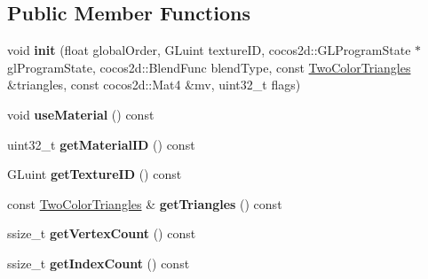 \subsection*{Public Member Functions}
\begin{DoxyCompactItemize}
\item 
\mbox{\label{classspine_1_1TwoColorTrianglesCommand_a385e4c629471fbf28207ce3c9ecf8922}} 
void {\bfseries init} (float global\+Order, G\+Luint texture\+ID, cocos2d\+::\+G\+L\+Program\+State $\ast$gl\+Program\+State, cocos2d\+::\+Blend\+Func blend\+Type, const \hyperlink{structspine_1_1TwoColorTriangles}{Two\+Color\+Triangles} \&triangles, const cocos2d\+::\+Mat4 \&mv, uint32\+\_\+t flags)
\item 
\mbox{\label{classspine_1_1TwoColorTrianglesCommand_af94b5a1ddde5fe423a5909f4dbcbc3c4}} 
void {\bfseries use\+Material} () const
\item 
\mbox{\label{classspine_1_1TwoColorTrianglesCommand_a36522af91f9258f5e95e19a1270063fa}} 
uint32\+\_\+t {\bfseries get\+Material\+ID} () const
\item 
\mbox{\label{classspine_1_1TwoColorTrianglesCommand_a45e1262efa0ca57f1e171296aedd0a69}} 
G\+Luint {\bfseries get\+Texture\+ID} () const
\item 
\mbox{\label{classspine_1_1TwoColorTrianglesCommand_a0a2025593c24a8086a1e5768f64b184a}} 
const \hyperlink{structspine_1_1TwoColorTriangles}{Two\+Color\+Triangles} \& {\bfseries get\+Triangles} () const
\item 
\mbox{\label{classspine_1_1TwoColorTrianglesCommand_afead0b50dd361b52874e96fbecd6d2b3}} 
ssize\+\_\+t {\bfseries get\+Vertex\+Count} () const
\item 
\mbox{\label{classspine_1_1TwoColorTrianglesCommand_a5ebeeb42e2e43bdb69d04c6f96c41ef0}} 
ssize\+\_\+t {\bfseries get\+Index\+Count} () const
\item 
\mbox{\label{classspine_1_1TwoColorTrianglesCommand_aa7ddde4c1fe9c027b88f16d4f0b26350}} 

\end{DoxyCompactItemize}
